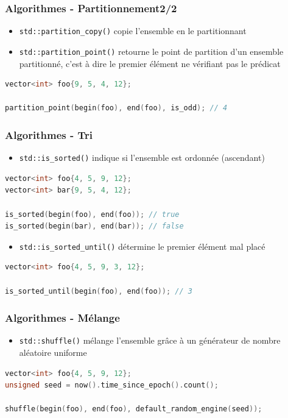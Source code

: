 \documentclass[C++.tex]{subfiles}
\begin{document}
\begin{frame}[fragile]
	\frametitle{Algorithmes - Partitionnement\titlehfill{}2/2}
	\begin{itemize}
		\item \lstinline|std::partition_copy()| copie l'ensemble en le partitionnant
		\item \lstinline|std::partition_point()| retourne le point de partition d'un ensemble partitionné, c'est à dire le premier élément ne vérifiant pas le prédicat
	\end{itemize}

	\begin{lstlisting}[language=C++]
vector<int> foo{9, 5, 4, 12};

partition_point(begin(foo), end(foo), is_odd); // 4\end{lstlisting}
\end{frame}

\begin{frame}[fragile]
	\frametitle{Algorithmes - Tri}
	\begin{itemize}
		\item \lstinline|std::is_sorted()| indique si l'ensemble est ordonnée (ascendant)
	\end{itemize}


	\begin{lstlisting}[language=C++]
vector<int> foo{4, 5, 9, 12};
vector<int> bar{9, 5, 4, 12};

is_sorted(begin(foo), end(foo)); // true
is_sorted(begin(bar), end(bar)); // false\end{lstlisting}

	\begin{itemize}
		\item \lstinline|std::is_sorted_until()| détermine le premier élément mal placé
	\end{itemize}

	\begin{lstlisting}[language=C++]
vector<int> foo{4, 5, 9, 3, 12};

is_sorted_until(begin(foo), end(foo)); // 3\end{lstlisting}
\end{frame}

\begin{frame}[fragile]
	\frametitle{Algorithmes - Mélange}
	\begin{itemize}
		\item \lstinline|std::shuffle()| mélange l'ensemble grâce à un générateur de nombre aléatoire \og uniforme\fg{}
	\end{itemize}

	\begin{lstlisting}[language=C++]
vector<int> foo{4, 5, 9, 12};
unsigned seed = now().time_since_epoch().count();

shuffle(begin(foo), end(foo), default_random_engine(seed));\end{lstlisting}

\end{frame}
\end{document}
